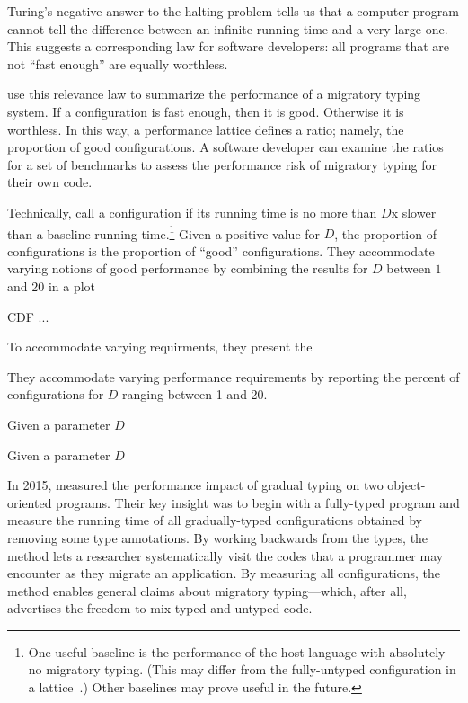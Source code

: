 Turing's negative answer to the halting problem tells us that a computer
 program cannot tell the difference between an infinite running time and
 a very large one.
This suggests a corresponding law for software developers:
 all programs that are not ``fast enough'' are equally worthless.

\citet{tfgnvf-popl-2016} use this relevance law to summarize the performance
 of a migratory typing system.
If a configuration is fast enough, then it is good.
Otherwise it is worthless.
In this way, a performance lattice defines a ratio; namely, the proportion of
 good configurations.
A software developer can examine the ratios for a set of benchmarks to
 assess the performance risk of migratory typing for their own code.

Technically, \citet{tfgnvf-popl-2016} call a configuration 
 if its running time is no more than $D$x slower than a baseline running
 time.\footnote{One useful baseline is the performance of the host language
 with absolutely no migratory typing.
 (This may differ from the fully-untyped configuration in a lattice~\cite{gm-pepm-2018}.)
 Other baselines may prove useful in the future.}
Given a positive value for $D$, the proportion of  configurations
 is the proportion of ``good'' configurations.
They accommodate varying notions of good performance by combining the results
 for $D$ between $1$ and $20$ in a plot

 CDF ...


To accommodate varying requirments, they present the 

They accommodate varying performance requirements by reporting the percent
 of  configurations for $D$ ranging between 1 and 20.
 


Given a parameter $D$ 

Given a parameter $D$




In 2015, \citet{tfdfftf-ecoop-2015} measured the performance impact of gradual typing on
 two object-oriented programs.
Their key insight was to begin with a fully-typed program and measure the
 running time of all gradually-typed configurations obtained by removing
 some type annotations.
By working backwards from the types, the method lets a researcher systematically
 visit the codes that a programmer may encounter as they migrate an
 application.
By measuring all configurations, the method enables general claims about
 migratory typing---which, after all, advertises the freedom to mix typed
 and untyped code.


